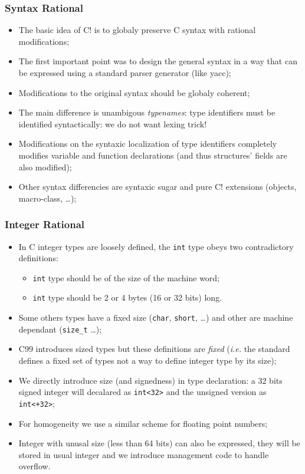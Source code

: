 \documentclass[pdftex]{beamer}
\begin{document}
\begin{frame}
  \frametitle{Syntax Rational}
  \begin{itemize}
  \item The basic idea of C! is to globaly preserve C syntax with rational
    modifications;
  \item The first important point was to design the general syntax in a
    way that can be expressed using a standard parser generator (like
    yacc);
  \item Modifications to the original syntax should be globaly coherent;
  \item The main difference is unambigous \emph{typenames}: type
    identifiers must be identified syntactically: we do not want lexing
    trick!
  \item Modifications on the syntaxic localization of type identifiers
    completely modifies variable and function declarations (and thus
    structures' fields are also modified);
  \item Other syntax differencies are syntaxic sugar and pure C!
    extensions (objects, macro-class, \ldots);
  \end{itemize}
\end{frame}

\begin{frame}[fragile]
  \frametitle{Integer Rational}
  \begin{itemize}
  \item In C integer types are loosely defined, the \texttt{int} type
    obeys two contradictory definitions:
    \begin{itemize}
    \item \texttt{int} type should be of the size of the machine word;
    \item \texttt{int} type should be 2 or 4 bytes (16 or 32 bits) long.
    \end{itemize}
  \item Some others types have a fixed size (\texttt{char},
    \texttt{short}, \ldots) and other are machine dependant
    (\texttt{size\_t} \ldots);
  \item C99 introduces sized types but these definitions are
    \emph{fixed} (\emph{i.e.} the standard defines a fixed set of
    types not a way to define integer type by its size);
  \item We directly introduce size (and signedness) in type
    declaration: a 32 bits signed integer will decalared as
    \verb|int<32>| and the unsigned version as \verb|int<+32>|;
  \item For homogeneity we use a similar scheme for floating point numbers;
  \item Integer with unusal size (less than 64 bits) can also be
    expressed, they will be stored in usual integer and we introduce
    management code to handle overflow.
  \end{itemize}
\end{frame}
\end{document}
